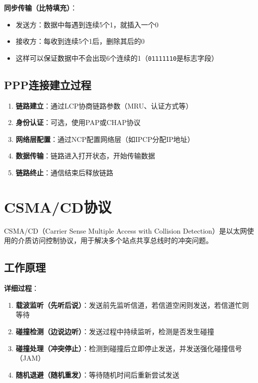 \documentclass[12pt,a4paper,openany]{ctexbook}
\begin{document}
\textbf{同步传输（比特填充）}：
\begin{itemize}[leftmargin=2em,itemsep=0pt]
    \item 发送方：数据中每遇到连续5个1，就插入一个0
    \item 接收方：每收到连续5个1后，删除其后的0
    \item 这样可以保证数据中不会出现6个连续的1（\texttt{01111110}是标志字段）
\end{itemize}

\subsection{PPP连接建立过程}
\begin{enumerate}[leftmargin=2em,itemsep=0pt]
    \item \textbf{链路建立}：通过LCP协商链路参数（MRU、认证方式等）
    \item \textbf{身份认证}：可选，使用PAP或CHAP协议
    \item \textbf{网络层配置}：通过NCP配置网络层（如IPCP分配IP地址）
    \item \textbf{数据传输}：链路进入打开状态，开始传输数据
    \item \textbf{链路终止}：通信结束后释放链路
\end{enumerate}

\section{CSMA/CD协议}
CSMA/CD（Carrier Sense Multiple Access with Collision Detection）是以太网使用的介质访问控制协议，用于解决多个站点共享总线时的冲突问题。

\subsection{工作原理}
\begin{center}
\end{center}

\textbf{详细过程}：
\begin{enumerate}[leftmargin=2em,itemsep=0pt]
    \item \textbf{载波监听（先听后说）}：发送前先监听信道，若信道空闲则发送，若信道忙则等待
    \item \textbf{碰撞检测（边说边听）}：发送过程中持续监听，检测是否发生碰撞
    \item \textbf{碰撞处理（冲突停止）}：检测到碰撞后立即停止发送，并发送强化碰撞信号（JAM）
    \item \textbf{随机退避（随机重发）}：等待随机时间后重新尝试发送
\end{enumerate}
\end{document}

